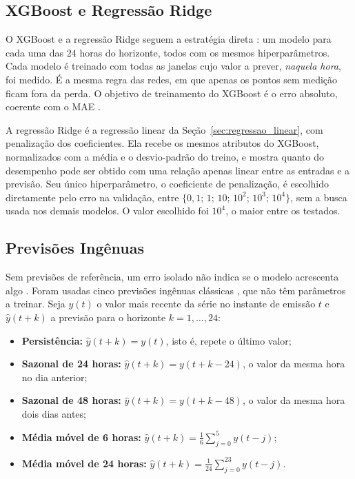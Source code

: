 \subsection{XGBoost e Regressão Ridge}

O XGBoost e a regressão Ridge seguem a estratégia direta \cite{taieb2012review}: um modelo para cada uma das 24 horas do horizonte, todos com os mesmos hiperparâmetros. Cada modelo é treinado com todas as janelas cujo valor a prever, \emph{naquela hora}, foi medido. É a mesma regra das redes, em que apenas os pontos sem medição ficam fora da perda. O objetivo de treinamento do XGBoost é o erro absoluto, coerente com o MAE \cite{gneiting2011making}.

A regressão Ridge \cite{hoerl1970ridge} é a regressão linear da Seção~\ref{sec:regressao_linear}, com penalização dos coeficientes. Ela recebe os mesmos atributos do XGBoost, normalizados com a média e o desvio-padrão do treino, e mostra quanto do desempenho pode ser obtido com uma relação apenas linear entre as entradas e a previsão. Seu único hiperparâmetro, o coeficiente de penalização, é escolhido diretamente pelo erro na validação, entre \(\{0{,}1;\,1;\,10;\,10^2;\,10^3;\,10^4\}\), sem a busca usada nos demais modelos. O valor escolhido foi \(10^4\), o maior entre os testados.

\subsection{Previsões Ingênuas}
\label{sec:referencias_comparacao}

Sem previsões de referência, um erro isolado não indica se o modelo acrescenta algo \cite{hyndman2021forecasting,zeng2023transformers}. Foram usadas cinco previsões ingênuas clássicas \cite{hyndman2021forecasting}, que não têm parâmetros a treinar. Seja \(y(t)\) o valor mais recente da série no instante de emissão \(t\) e \(\hat{y}(t+k)\) a previsão para o horizonte \(k=1,\ldots,24\):

\begin{itemize}
    \item \textbf{Persistência:} \(\hat{y}(t+k)=y(t)\), isto é, repete o último valor;
    \item \textbf{Sazonal de 24 horas:} \(\hat{y}(t+k)=y(t+k-24)\), o valor da mesma hora no dia anterior;
    \item \textbf{Sazonal de 48 horas:} \(\hat{y}(t+k)=y(t+k-48)\), o valor da mesma hora dois dias antes;
    \item \textbf{Média móvel de 6 horas:} \(\hat{y}(t+k)=\frac{1}{6}\sum_{j=0}^{5} y(t-j)\);
    \item \textbf{Média móvel de 24 horas:} \(\hat{y}(t+k)=\frac{1}{24}\sum_{j=0}^{23} y(t-j)\).
\end{itemize}

